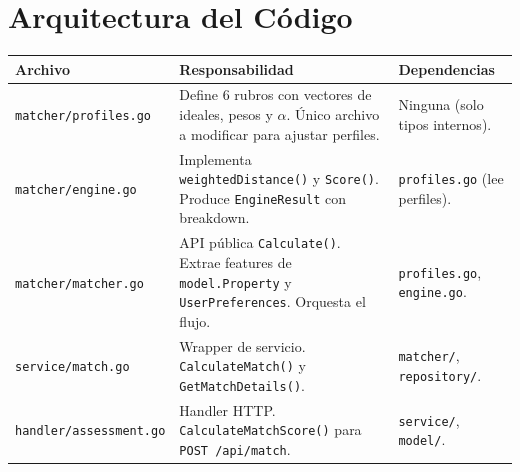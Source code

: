 \documentclass[11pt,a4paper]{article}
\begin{document}
\section{Arquitectura del Código}
\begin{table}[H]
    \centering
    \renewcommand{\arraystretch}{1.2}
    \begin{tabularx}{\textwidth}{>{\hsize=0.3\hsize}X >{\hsize=0.35\hsize}X >{\hsize=0.35\hsize}X}
        \toprule
        \textbf{Archivo} & \textbf{Responsabilidad} & \textbf{Dependencias} \\
        \midrule
        \texttt{matcher/profiles.go} & Define 6 rubros con vectores de ideales, pesos y $\alpha$. Único archivo a modificar para ajustar perfiles. & Ninguna (solo tipos internos). \\
        \texttt{matcher/engine.go} & Implementa \texttt{weightedDistance()} y \texttt{Score()}. Produce \texttt{EngineResult} con breakdown. & \texttt{profiles.go} (lee perfiles). \\
        \texttt{matcher/matcher.go} & API pública \texttt{Calculate()}. Extrae features de \texttt{model.Property} y \texttt{UserPreferences}. Orquesta el flujo. & \texttt{profiles.go}, \texttt{engine.go}. \\
        \texttt{service/match.go} & Wrapper de servicio. \texttt{CalculateMatch()} y \texttt{GetMatchDetails()}. & \texttt{matcher/}, \texttt{repository/}. \\
        \texttt{handler/assessment.go} & Handler HTTP. \texttt{CalculateMatchScore()} para \texttt{POST /api/match}. & \texttt{service/}, \texttt{model/}. \\
        \bottomrule
    \end{tabularx}
\end{table}
\end{document}
